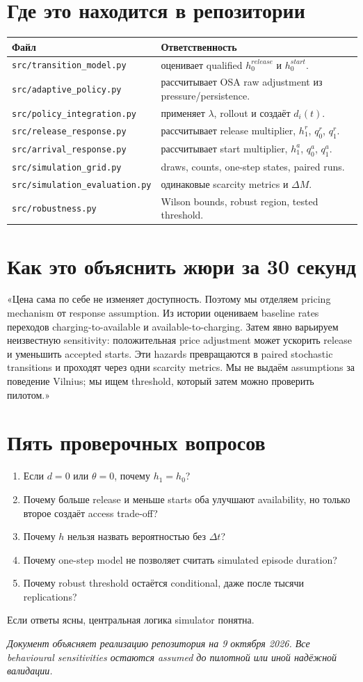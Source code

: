 \documentclass[11pt,a4paper]{article}
\newcommand{\code}[1]{\texttt{#1}}
\begin{document}
\section{Где это находится в репозитории}
\begin{longtable}{p{5.5cm}p{10.5cm}}
\toprule Файл & Ответственность \\\midrule\endhead
\code{src/transition\_model.py} & оценивает qualified $h_0^{release}$ и $h_0^{start}$.\\
\code{src/adaptive\_policy.py} & рассчитывает OSA raw adjustment из pressure/persistence.\\
\code{src/policy\_integration.py} & применяет $\lambda$, rollout и создаёт $d_i(t)$.\\
\code{src/release\_response.py} & рассчитывает release multiplier, $h_1^r$, $q_0^r$, $q_1^r$.\\
\code{src/arrival\_response.py} & рассчитывает start multiplier, $h_1^a$, $q_0^a$, $q_1^a$.\\
\code{src/simulation\_grid.py} & draws, counts, one-step states, paired runs.\\
\code{src/simulation\_evaluation.py} & одинаковые scarcity metrics и $\Delta M$.\\
\code{src/robustness.py} & Wilson bounds, robust region, tested threshold.\\
\bottomrule
\end{longtable}

\section{Как это объяснить жюри за 30 секунд}
«Цена сама по себе не изменяет доступность. Поэтому мы отделяем pricing mechanism от response assumption. Из истории оцениваем baseline rates переходов charging-to-available и available-to-charging. Затем явно варьируем неизвестную sensitivity: положительная price adjustment может ускорить release и уменьшить accepted starts. Эти hazards превращаются в paired stochastic transitions и проходят через одни scarcity metrics. Мы не выдаём assumptions за поведение Vilnius; мы ищем threshold, который затем можно проверить пилотом.»

\section{Пять проверочных вопросов}
\begin{enumerate}
\item Если $d=0$ или $\theta=0$, почему $h_1=h_0$?
\item Почему больше release и меньше starts оба улучшают availability, но только второе создаёт access trade-off?
\item Почему $h$ нельзя назвать вероятностью без $\Delta t$?
\item Почему one-step model не позволяет считать simulated episode duration?
\item Почему robust threshold остаётся conditional, даже после тысячи replications?
\end{enumerate}
Если ответы ясны, центральная логика simulator понятна.

\vfill\small\textit{Документ объясняет реализацию репозитория на 9 октября 2026. Все behavioural sensitivities остаются assumed до пилотной или иной надёжной валидации.}
\end{document}
